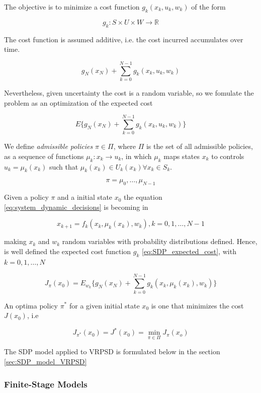 The objective is to minimize a cost function $g_k(x_k,u_k,w_k)$ of the form

\[g_k:S\times U \times W \rightarrow \mathbb{R}\]

The cost function is assumed additive, i.e. the cost incurred accumulates over time.

\[g_N(x_N)+\sum_{k=0}^{N-1}g_k(x_k,u_k,w_k)\]

Nevertheless, given uncertainty the cost is a random variable, so we fomulate the problem as an optimization of the expected cost 

\begin{equation}\label{eq:SDP_expected_cost}
 E\biggr\{g_N(x_N)+\sum_{k=0}^{N-1}g_k(x_k,u_k,w_k)\biggr\}
\end{equation}

We define \textit{admissible policies} $\pi \in \Pi$, where $\Pi$ is the set of all admissible policies, as a sequence of functions $\mu_k:x_k\rightarrow u_k$, in which $\mu_k$ maps states $x_k$ to controls $u_k=\mu_k(x_k)$ such that $\mu_k(x_k) \in U_k(x_k) \forall x_k \in S_k$.

\[\pi={\mu_0,\ldots,\mu_{N-1}}\]

Given a policy $\pi$ and a initial state $x_0$ the equation \ref{eq:system_dynamic_decisions} is becoming in 

\begin{equation}\label{eq:system_dynamic_policy}
x_{k+1}=f_k(x_k,\mu_k(x_k),w_k), k=0,1,\ldots,N-1 
\end{equation}

making $x_k$ and $w_k$ random variables with probability distributions defined. Hence, is well defined the expected cost function $g_k$ \ref{eq:SDP_expected_cost}, with $k=0,1,\ldots,N$

\begin{equation}\label{eq:SDP_expected_cost_policy}
 J_\pi(x_0) = E_{w_k}\biggr\{g_N(x_N)+\sum_{k=0}^{N-1}g_k(x_k,\mu_k(x_k),w_k)\biggr\}
\end{equation}

An optima policy $\pi^*$ for a given initial state $x_0$ is one that minimizes the cost $J(x_0)$, i.e

\[J_{\pi^*}(x_0)=J^*(x_0)=\min\limits_{\pi\in\Pi}J_\pi(x_o)\]


The SDP model applied to VRPSD is formulated below in the section \ref{sec:SDP_model_VRPSD}


\subsubsection{Finite-Stage Models}%


